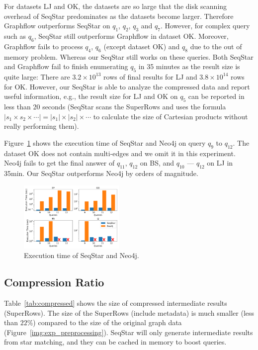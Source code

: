 For datasets LJ and OK, the datasets are so large that the disk scanning overhead of SeqStar predominates as the datasets become larger.
Therefore Graphflow outperforms SeqStar on $q_1$, $q_2$, $q_3$ and $q_7$.
However, for complex query such as $q_6$, SeqStar still outperforms Graphflow in dataset OK\@.
Moreover, Graphflow fails to process $q_4$, $q_6$ (except dataset OK) and $q_8$ due to the out of memory problem.
Whereas our SeqStar still works on these queries.
Both SeqStar and Graphflow fail to finish enumerating $q_5$ in 35 minutes as the result size is quite large:
There are $3.2 \times 10^{13}$ rows of final results for LJ and $3.8 \times 10^{14}$ rows for OK\@.
However, our SeqStar is able to analyze the compressed data and report useful information,
e.g., the result size for LJ and OK on $q_5$ can be reported in less than 20 seconds
(SeqStar scans the SuperRows and uses the formula $|s_1 \times s_2 \times \cdots| = |s_1| \times |s_2| \times \cdots$ to calculate the size of Cartesian products without really performing them).

Figure~\ref{img:exp_compare_neo4j} shows the execution time of SeqStar and Neo4j on query $q_9$ to $q_{12}$.
The dataset OK does not contain multi-edges and we omit it in this experiment.
Neo4j fails to get the final answer of $q_{11}$, $q_{12}$ on BS, and $q_{10}$ --- $q_{12}$ on LJ in 35min.
Our SeqStar outperforms Neo4j by orders of magnitude.
\begin{figure}[ht]
  \centering
  \includegraphics[width=0.45\textwidth]{img/exp_compare_neo4j.pdf}
  \caption{Execution time of SeqStar and Neo4j.}\label{img:exp_compare_neo4j}
\end{figure}
\subsection{Compression Ratio}\label{sec:experiments_compress}
Table~\ref{tab:compressed} shows the size of compressed intermediate results (SuperRows).
The size of the SuperRows (include metadata) is much smaller (less than $22\%$) compared to the size of the original graph data (Figure~\ref{img:exp_preprocessing}).
SeqStar will only generate intermediate results from star matching,
and they can be cached in memory to boost queries.


